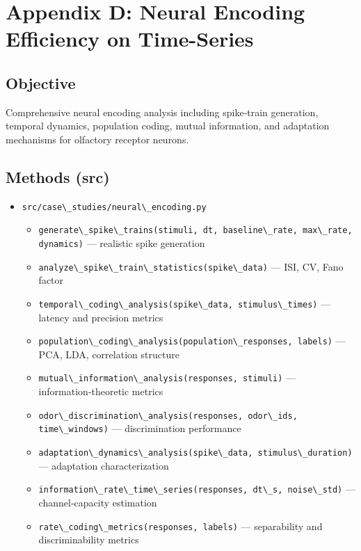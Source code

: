 \documentclass[
  13pt,
  a4paperpaper,
  12pt]{article}
\author{}
\date{}
\newcommand{\passthrough}[1]{#1}
\providecommand{\tightlist}{%
  \setlength{\itemsep}{0pt}\setlength{\parskip}{0pt}}
\let\oldsection\section
\renewcommand{\section}{\clearpage\oldsection}
\begin{document}
{
\hypersetup{linkcolor=black}
\setcounter{tocdepth}{3}
\tableofcontents
}
\section{Appendix D: Neural Encoding Efficiency on
Time-Series}\label{sec:app_neural_encoding}

\subsection{Objective}\label{objective}

Comprehensive neural encoding analysis including spike‑train generation,
temporal dynamics, population coding, mutual information, and adaptation
mechanisms for olfactory receptor neurons.

\subsection{Methods (src)}\label{methods-src}

\begin{itemize}
\tightlist
\item
  \passthrough{\lstinline!src/case\_studies/neural\_encoding.py!}

  \begin{itemize}
  \tightlist
  \item
    \passthrough{\lstinline!generate\_spike\_trains(stimuli, dt, baseline\_rate, max\_rate, dynamics)!}
    --- realistic spike generation
  \item
    \passthrough{\lstinline!analyze\_spike\_train\_statistics(spike\_data)!}
    --- ISI, CV, Fano factor
  \item
    \passthrough{\lstinline!temporal\_coding\_analysis(spike\_data, stimulus\_times)!}
    --- latency and precision metrics
  \item
    \passthrough{\lstinline!population\_coding\_analysis(population\_responses, labels)!}
    --- PCA, LDA, correlation structure
  \item
    \passthrough{\lstinline!mutual\_information\_analysis(responses, stimuli)!}
    --- information‑theoretic metrics
  \item
    \passthrough{\lstinline!odor\_discrimination\_analysis(responses, odor\_ids, time\_windows)!}
    --- discrimination performance
  \item
    \passthrough{\lstinline!adaptation\_dynamics\_analysis(spike\_data, stimulus\_duration)!}
    --- adaptation characterization
  \item
    \passthrough{\lstinline!information\_rate\_time\_series(responses, dt\_s, noise\_std)!}
    --- channel‑capacity estimation
  \item
    \passthrough{\lstinline!rate\_coding\_metrics(responses, labels)!}
    --- separability and discriminability metrics
  \end{itemize}
\end{itemize}
\end{document}

